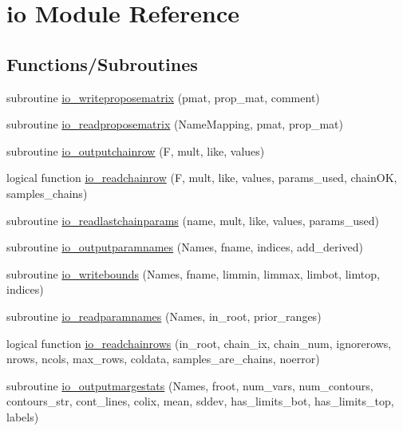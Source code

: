 \hypertarget{namespaceio}{}\section{io Module Reference}
\label{namespaceio}
\subsection*{Functions/\+Subroutines}
\begin{DoxyCompactItemize}
\item 
subroutine \mbox{\hyperlink{namespaceio_a66f16ed76a4e04dc87230befac8fb1cf}{io\+\_\+writeproposematrix}} (pmat, prop\+\_\+mat, comment)
\item 
subroutine \mbox{\hyperlink{namespaceio_a4734dc919ea1333d891f5bc59cedfc66}{io\+\_\+readproposematrix}} (Name\+Mapping, pmat, prop\+\_\+mat)
\item 
subroutine \mbox{\hyperlink{namespaceio_a304998b946633408764eeaf9b32b5687}{io\+\_\+outputchainrow}} (F, mult, like, values)
\item 
logical function \mbox{\hyperlink{namespaceio_a2ec9ab3b6936778533ec623b98d2b7b0}{io\+\_\+readchainrow}} (F, mult, like, values, params\+\_\+used, chain\+OK, samples\+\_\+chains)
\item 
subroutine \mbox{\hyperlink{namespaceio_a9de0b570ee4f35ba8e729e08cd26f7fe}{io\+\_\+readlastchainparams}} (name, mult, like, values, params\+\_\+used)
\item 
subroutine \mbox{\hyperlink{namespaceio_aa16f5fbf54e4430bea5bda0c8ab2f40e}{io\+\_\+outputparamnames}} (Names, fname, indices, add\+\_\+derived)
\item 
subroutine \mbox{\hyperlink{namespaceio_a767aeea14da167ae9027cac1b5b0a021}{io\+\_\+writebounds}} (Names, fname, limmin, limmax, limbot, limtop, indices)
\item 
subroutine \mbox{\hyperlink{namespaceio_a5bb562a4b599ac448a717abd04d9d856}{io\+\_\+readparamnames}} (Names, in\+\_\+root, prior\+\_\+ranges)
\item 
logical function \mbox{\hyperlink{namespaceio_af9199bcf411dd77ceb40961983436c41}{io\+\_\+readchainrows}} (in\+\_\+root, chain\+\_\+ix, chain\+\_\+num, ignorerows, nrows, ncols, max\+\_\+rows, coldata, samples\+\_\+are\+\_\+chains, noerror)
\item 
subroutine \mbox{\hyperlink{namespaceio_a4e9e0bbb9fe4d25b43fe615489cdf0a2}{io\+\_\+outputmargestats}} (Names, froot, num\+\_\+vars, num\+\_\+contours, contours\+\_\+str, cont\+\_\+lines, colix, mean, sddev, has\+\_\+limits\+\_\+bot, has\+\_\+limits\+\_\+top, labels)
\end{DoxyCompactItemize}


